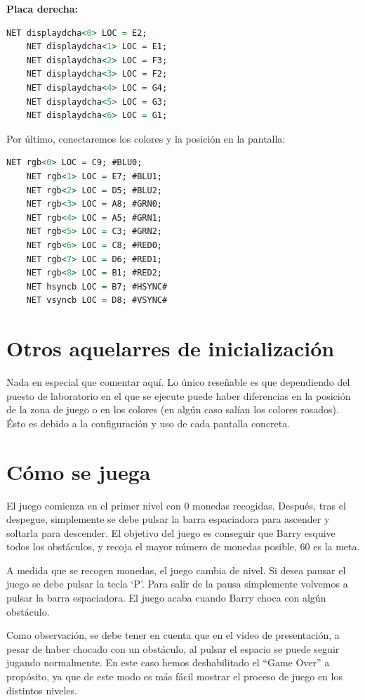 \documentclass[11pt, a4paper, spanish, openright, twoside]{book}
\begin{document}
\textbf{Placa derecha:}
	
\begin{lstlisting}[language=VHDL]
	NET displaydcha<0> LOC = E2;
	NET displaydcha<1> LOC = E1;
	NET displaydcha<2> LOC = F3;
	NET displaydcha<3> LOC = F2;
	NET displaydcha<4> LOC = G4;
	NET displaydcha<5> LOC = G3;
	NET displaydcha<6> LOC = G1;
\end{lstlisting}


Por último, conectaremos los colores y la posición en la pantalla:

\begin{lstlisting}[language=VHDL]
	NET rgb<0> LOC = C9; #BLU0;
	NET rgb<1> LOC = E7; #BLU1;
	NET rgb<2> LOC = D5; #BLU2;
	NET rgb<3> LOC = A8; #GRN0; 
	NET rgb<4> LOC = A5; #GRN1;
	NET rgb<5> LOC = C3; #GRN2;
	NET rgb<6> LOC = C8; #RED0;
	NET rgb<7> LOC = D6; #RED1;
	NET rgb<8> LOC = B1; #RED2;
	NET hsyncb LOC = B7; #HSYNC# 
	NET vsyncb LOC = D8; #VSYNC# 
\end{lstlisting}

\section{Otros aquelarres de inicialización}

Nada en especial que comentar aquí. Lo único reseñable es que dependiendo del puesto de laboratorio en el que se ejecute puede haber diferencias en la posición de la zona de juego o en los colores (en algún caso salían los colores rosados). Ésto es debido a la configuración y uso de cada pantalla concreta.


\section{Cómo se juega}
El juego comienza en el primer nivel con 0 monedas recogidas. Después, tras el despegue, simplemente se debe pulsar la barra espaciadora para ascender y soltarla para descender. El objetivo del juego es conseguir que Barry esquive todos los obstáculos, y recoja el mayor número de monedas posible, 60 es la meta. 

A medida que se recogen monedas, el juego cambia de nivel. Si desea pausar el juego se debe pulsar la tecla `P'. Para salir de la pausa simplemente volvemos a pulsar la barra espaciadora. El juego acaba cuando Barry choca con algún obstáculo.

Como observación, se debe tener en cuenta que en el video de presentación, a pesar de haber chocado con un obstáculo, al pulsar el espacio se puede seguir jugando normalmente. En este caso hemos deshabilitado el ``Game Over'' a propósito, ya que de este modo es más fácil mostrar el proceso de juego en los distintos niveles.
\end{document}
